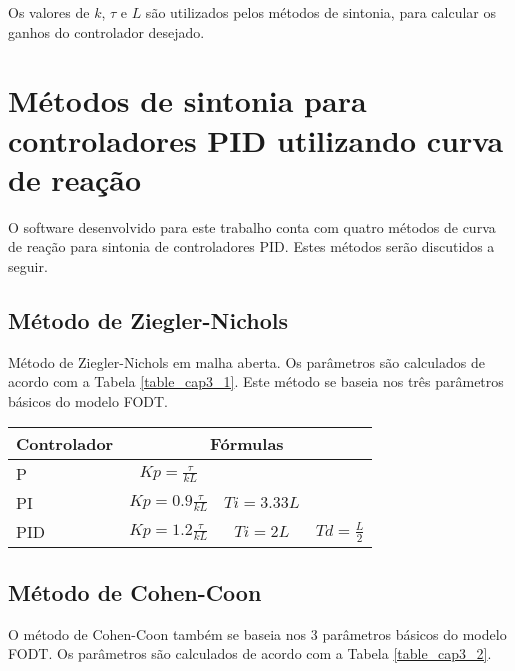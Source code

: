     Os valores de $k$, $\tau$ e $L$ são
    utilizados pelos métodos de sintonia, para calcular os ganhos do controlador desejado.


\section{Métodos de sintonia para controladores \acs{PID} utilizando curva de reação}

    O software desenvolvido para este trabalho conta com quatro métodos de
    curva de reação para sintonia de controladores \acs{PID}. Estes métodos
    serão discutidos a seguir.
    
    \subsection{Método de Ziegler-Nichols}
        
        Método de Ziegler-Nichols em malha aberta. Os parâmetros são calculados
        de acordo com a Tabela \ref{table_cap3_1}. Este método se baseia nos três parâmetros
        básicos do modelo \acs{FODT}.
       

        \begin{center}
            \begin{tabular}{l*{3}{c}}
            \label{table_cap3_1}
Controlador & \multicolumn{3}{c}{Fórmulas} \\
\hline
P   & $Kp = \frac{\tau}{kL}$     &              & \\
PI  & $Kp = 0.9 \frac{\tau}{kL}$ & $Ti = 3.33L$ & \\
PID & $Kp = 1.2 \frac{\tau}{kL}$ & $Ti = 2L$ & $Td = \frac{L}{2}$ \\
            \end{tabular}
        \end{center}
    
    \subsection{Método de Cohen-Coon}
        
        O método de Cohen-Coon também se baseia nos 3 parâmetros básicos
        do modelo \acs{FODT}. Os parâmetros são calculados de acordo com
        a Tabela \ref{table_cap3_2}.
        
